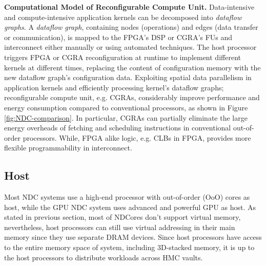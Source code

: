 \documentclass[letterpaper, 11pt, conference, margin=1in]{ieeeconf}   %
\begin{document}
\textbf{Computational Model of Reconfigurable Compute Unit.} Data-intensive and compute-intensive application kernels can be decomposed into \textit{dataflow graphs}. A \textit{dataflow graph}, containing nodes (operations) and edges (data transfer or communication), is mapped to the FPGA's DSP or CGRA's FUs and interconnect either manually or using automated techniques. The host processor triggers FPGA or CGRA reconfiguration at runtime to implement different kernels at different times, replacing the content of configuration memory with the new dataflow graph's configuration data. Exploiting spatial data parallelism in application kernels and efficiently processing kernel's dataflow graphs; reconfigurable compute unit, e.g. CGRAs, considerably improve performance and energy consumption compared to conventional processors, as shown in Figure \ref{fig:NDC-comparison}. In particular, CGRAs can partially eliminate the large energy overheads of fetching and scheduling instructions in conventional out-of-order processors. While, FPGA alike logic, e.g. CLBs in FPGA, provides more flexible programmability in interconnect.

\subsection{Host}
Most NDC systems use a high-end processor with out-of-order (OoO) cores as host, while the GPU NDC system uses advanced and powerful GPU as host. As stated in previous section, most of NDCores don't support virtual memory, nevertheless, host processors can still use virtual addressing in their main memory since they use separate DRAM devices. Since host processors have access to the entire memory space of system, including 3D-stacked memory, it is up to the host processors to distribute workloads across HMC vaults.
\end{document}
